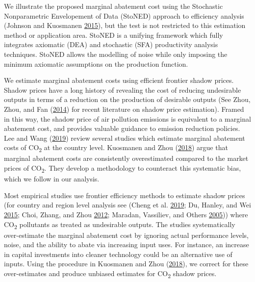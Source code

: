 \documentclass[
  12pt,
]{article}
\begin{document}
We illustrate the proposed marginal abatement cost using the Stochastic Nonparametric Envelopement of Data (StoNED) approach to efficiency analysis (Johnson and Kuosmanen \protect\hyperlink{ref-Johnson2015}{2015}), but the test is not restricted to this estimation method or application area. StoNED is a unifying framework which fully integrates axiomatic (DEA) and stochastic (SFA) productivity analysis techniques. StoNED allows the modelling of noise while only imposing the minimum axiomatic assumptions on the production function.

We estimate marginal abatement costs using efficient frontier shadow prices. Shadow prices have a long history of revealing the cost of reducing undesirable outputs in terms of a reduction on the production of desirable outputs (See Zhou, Zhou, and Fan (\protect\hyperlink{ref-Zhou2014}{2014}) for recent literature on shadow price estimation). Framed in this way, the shadow price of air pollution emissions is equivalent to a marginal abatement cost, and provides valuable guidance to emission reduction policies. Lee and Wang (\protect\hyperlink{ref-Lee2019}{2019}) review several studies which estimate marginal abatement costs of CO\textsubscript{2} at the country level. Kuosmanen and Zhou (\protect\hyperlink{ref-Kuosmanen2018b}{2018}) argue that marginal abatement costs are consistently overestimated compared to the market prices of CO\textsubscript{2}. They develop a methodology to counteract this systematic bias, which we follow in our analysis.

Most empirical studies use frontier efficiency methods to estimate shadow prices (for country and region level analysis see (Cheng et al. \protect\hyperlink{ref-Cheng2019}{2019}; Du, Hanley, and Wei \protect\hyperlink{ref-Du2015}{2015}; Choi, Zhang, and Zhou \protect\hyperlink{ref-Choi2012}{2012}; Maradan, Vassiliev, and Others \protect\hyperlink{ref-Maradan2005}{2005})) where CO\textsubscript{2} pollutants as treated as undesirable outputs. The studies systematically over-estimate the marginal abatement cost by ignoring actual performance levels, noise, and the ability to abate via increasing input uses. For instance, an increase in capital investments into cleaner technology could be an alternative use of inputs. Using the procedure in Kuosmanen and Zhou (\protect\hyperlink{ref-Kuosmanen2018b}{2018}), we correct for these over-estimates and produce unbiased estimates for CO\textsubscript{2} shadow prices.
\end{document}
